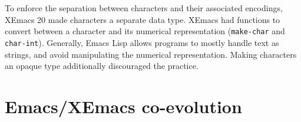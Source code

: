 \documentclass[format=acmsmall, review=false, screen=true]{acmart}
\begin{document}
To enforce the separation between characters and their associated
encodings, XEmacs 20 made characters a separate data type.  XEmacs had
functions to convert between a character and its numerical
representation (\texttt{make-char} and \texttt{char-int}).  Generally,
Emacs Lisp allows programs to mostly handle text as strings,
and avoid manipulating the numerical representation.  Making
characters an opaque type additionally discouraged the practice.












\section{Emacs/XEmacs co-evolution}
\label{sec:coevolution}
\end{document}
